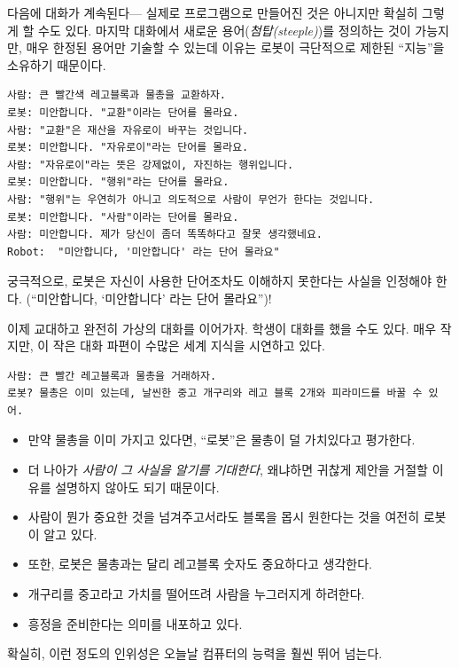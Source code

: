\documentclass[]{article}
\begin{document}
다음에 대화가 계속된다--- 실제로 프로그램으로 만들어진 것은 아니지만
확실히 그렇게 할 수도 있다. 마지막 대화에서 새로운
용어(\emph{첨탑(steeple)})를 정의하는 것이 가능지만, 매우 한정된 용어만
기술할 수 있는데 이유는 로봇이 극단적으로 제한된 ``지능''을 소유하기
때문이다.

\begin{verbatim}
사람: 큰 빨간색 레고블록과 물총을 교환하자.
로봇: 미안합니다. "교환"이라는 단어를 몰라요.
사람: "교환"은 재산을 자유로이 바꾸는 것입니다.
로봇: 미안합니다. "자유로이"라는 단어를 몰라요.
사람: "자유로이"라는 뜻은 강제없이, 자진하는 행위입니다.
로봇: 미안합니다. "행위"라는 단어를 몰라요.
사람: "행위"는 우연히가 아니고 의도적으로 사람이 무언가 한다는 것입니다.
로봇: 미안합니다. "사람"이라는 단어를 몰라요.
사람: 미안합니다. 제가 당신이 좀더 똑똑하다고 잘못 생각했네요.
Robot:  "미안합니다, '미안합니다' 라는 단어 몰라요"
\end{verbatim}

궁극적으로, 로봇은 자신이 사용한 단어조차도 이해하지 못한다는 사실을
인정해야 한다. (``미안합니다, `미안합니다' 라는 단어 몰라요'')!

이제 교대하고 완전히 가상의 대화를 이어가자. 학생이 대화를 했을 수도
있다. 매우 작지만, 이 작은 대화 파편이 수많은 세계 지식을 시연하고 있다.

\begin{verbatim}
사람: 큰 빨간 레고블록과 물총을 거래하자.
로봇? 물총은 이미 있는데, 날씬한 중고 개구리와 레고 블록 2개와 피라미드를 바꿀 수 있어.
\end{verbatim}

\begin{itemize}
\itemsep1pt\parskip0pt
\item
  만약 물총을 이미 가지고 있다면, ``로봇''은 물총이 덜 가치있다고
  평가한다.
\item
  더 나아가 \emph{사람이 그 사실을 알기를 기대한다}, 왜냐하면 귀찮게
  제안을 거절할 이유를 설명하지 않아도 되기 때문이다.
\item
  사람이 뭔가 중요한 것을 넘겨주고서라도 블록을 몹시 원한다는 것을
  여전히 로봇이 알고 있다.
\item
  또한, 로봇은 물총과는 달리 레고블록 숫자도 중요하다고 생각한다.
\item
  개구리를 중고라고 가치를 떨어뜨려 사람을 누그러지게 하려한다.
\item
  흥정을 준비한다는 의미를 내포하고 있다.
\end{itemize}

확실히, 이런 정도의 인위성은 오늘날 컴퓨터의 능력을 훨씬 뛰어 넘는다.
\end{document}
